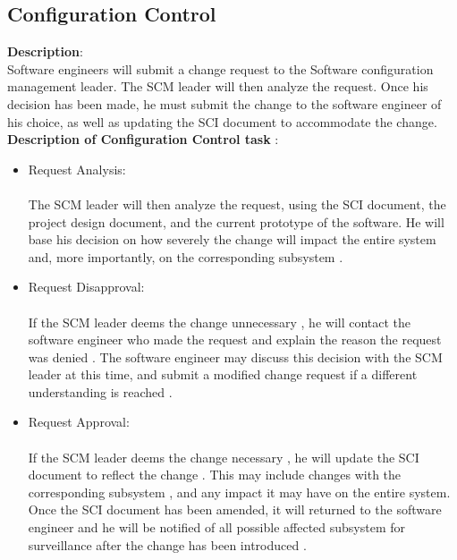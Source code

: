 \documentclass[12pt]{article}
\begin{document}
\subsection{Configuration Control}
\textbf{Description}: \\
Software engineers will submit a change request to the Software configuration management leader. The SCM leader will then analyze the request. Once his decision has been made, he must submit the change to the software engineer of his choice, as well as updating the SCI document to accommodate the change.\\
\textbf{Description of Configuration Control task} :\\
\begin{itemize}
    \item Request Analysis: \\ \\ The SCM leader will then analyze the request, using the SCI document, the project design document, and the current prototype of the software. He will base his decision on how severely the change will impact the entire system and, more importantly, on the corresponding subsystem .
    \item Request Disapproval: \\ \\ If the SCM leader deems the change unnecessary , he will contact the software engineer who made the request and explain the reason the request was denied . The software engineer may discuss this decision with the SCM leader at this time, and submit a modified change request if a different understanding is reached .
    \item Request Approval: \\  \\ If the SCM leader deems the change necessary , he will update the SCI document to reflect the change . This may include changes with the corresponding subsystem , and any impact it may have on the entire system. Once the SCI document has been amended, it will returned to the software engineer and he will be notified of all possible affected subsystem for surveillance after the change has been introduced .
    
\end{itemize}
\end{document}
